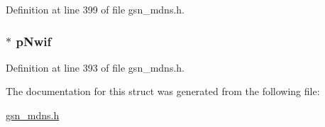 Definition at line 399 of file gsn\_\-mdns.h.

\hypertarget{a00144_a98d510676ecd134a5e9ac61bf222cded}{
\subsubsection[{pNwif}]{$\ast$ {\bf pNwif}}}
\label{a00144_a98d510676ecd134a5e9ac61bf222cded}


Definition at line 393 of file gsn\_\-mdns.h.



The documentation for this struct was generated from the following file:\begin{DoxyCompactItemize}
\item 
\hyperlink{a00526}{gsn\_\-mdns.h}\end{DoxyCompactItemize}
